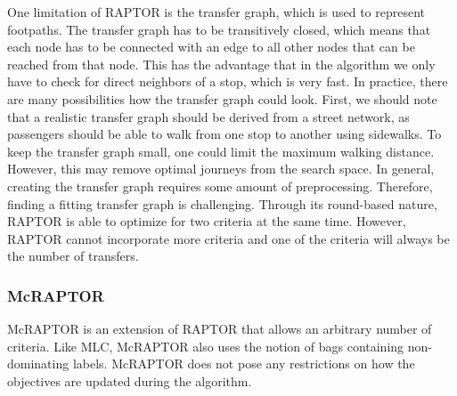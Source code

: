 One limitation of RAPTOR is the transfer graph, which is used to represent footpaths.
The transfer graph has to be transitively closed, which means that each node has to be connected with an edge to all other nodes that can be reached from that node.
This has the advantage that in the algorithm we only have to check for direct neighbors of a stop, which is very fast.
In practice, there are many possibilities how the transfer graph could look.
First, we should note that a realistic transfer graph should be derived from a street network, as passengers should be able to walk from one stop to another using sidewalks.
To keep the transfer graph small, one could limit the maximum walking distance.
However, this may remove optimal journeys from the search space.
In general, creating the transfer graph requires some amount of preprocessing.
Therefore, finding a fitting transfer graph is challenging.
Through its round-based nature, RAPTOR is able to optimize for two criteria at the same time.
However, RAPTOR cannot incorporate more criteria and one of the criteria will always be the number of transfers.


\subsubsection{McRAPTOR}
\label{subsubsec:mcraptor}

McRAPTOR  is an extension of RAPTOR that allows an arbitrary number of criteria.
Like MLC, McRAPTOR also uses the notion of bags containing non-dominating labels.
McRAPTOR does not pose any restrictions on how the objectives are updated during the algorithm.

